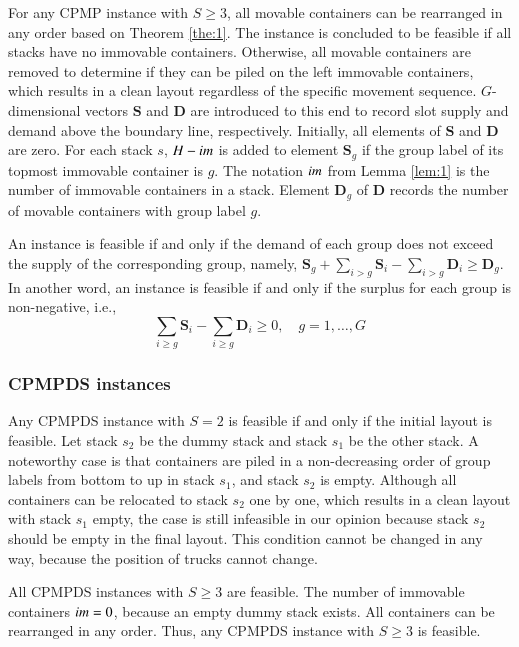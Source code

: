 \documentclass[review,3p,times,authoryear,12pt]{elsarticle}
\begin{document}
For any CPMP instance with $S\ge3$, all movable containers can be rearranged in any order based on Theorem \ref{the:1}.
The instance is concluded to be feasible if all stacks have no immovable containers. 
Otherwise, all movable containers are removed to determine if they can be piled on the left immovable containers, which results in a clean layout regardless of the specific movement sequence. $G$-dimensional vectors $\mathbf S$ and $\mathbf D$ are introduced to this end to record slot supply and demand above the boundary line, respectively.
Initially, all elements of $\mathbf S$ and $\mathbf D$ are zero. For each stack $s$, $H-\id{im}$ is added to element $\mathbf S_g$ if the group label of its topmost immovable container is $g$.
The notation $\id{im}$ from Lemma \ref{lem:1} is the number of immovable containers in a stack. Element $\mathbf D_g$ of $\mathbf D$ records the number of movable containers with group label $g$.

An instance is feasible if and only if the demand of each group does not exceed the supply of the corresponding group, namely, $\mathbf S_g+\sum\limits_{i>g}\mathbf S_i-\sum\limits_{i>g}\mathbf D_i\ge \mathbf D_g$.
In another word, an instance is feasible if and only if the surplus for each group is non-negative, i.e.,
\begin{equation}
\label{equ:2}
\sum\limits_{i\ge g}\mathbf S_i-\sum\limits_{i\ge g}\mathbf D_i\ge0, \quad g=1,\dots,G
\end{equation}

\subsubsection{CPMPDS instances}

Any CPMPDS instance with $S=2$ is feasible if and only if the initial layout is feasible. Let stack $s_2$ be the dummy stack and stack $s_1$ be the other stack. A noteworthy case is that containers are piled in a non-decreasing order of group labels from bottom to up in stack $s_1$, and stack $s_2$ is empty. Although all containers can be relocated to stack $s_2$ one by one, which results in a clean layout with stack $s_1$ empty, the case is still infeasible in our opinion because stack $s_2$ should be empty in the final layout. This condition cannot be changed in any way, because the position of trucks cannot change.

All CPMPDS instances with $S\ge3$ are feasible. The number of immovable containers $\id{im}=0$, because an empty dummy stack exists. All containers can be rearranged in any order. 
Thus, any CPMPDS instance with $S\ge3$ is feasible.
\end{document}
